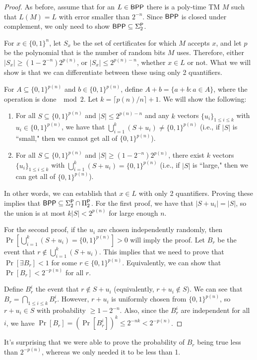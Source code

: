 \begin{proof}
As before, assume that for an $L \in {\ensuremath{\mathsf{BPP}}}$ there is a poly-time TM $M$ such that $L(M) = L$ with error smaller than $2^{-n}$. Since ${\mathsf{BPP}}$ is closed under complement, we only need to show ${\mathsf{BPP}} \subseteq \Sigma_2^{\mathsf{P}}$.

\par For $x \in \{0, 1\}^n$, let $S_x$ be the set of certificates for which $M$ accepts $x$, and let $p$ be the polynomial that is the number of random bits $M$ uses. Therefore, either $|S_x| \ge (1-2^{-n})2^{p(n)}$, or $|S_x| \le 2^{p(n)-n}$, whether $x \in L$ or not. What we will show is that we can differentiate between these using only 2 quantifiers.

\par For $A \subseteq \{0, 1\}^{p(n)}$ and $b \in \{0, 1\}^{p(n)}$, define $A+b = \{a+b \colon a \in A\}$, where the operation is done $\mod 2$. Let $k = \lceil {p(n)/n} \rceil +1$. We will show the following:

\begin{enumerate}
\item For all $S \subseteq \{0, 1\}^{p(n)}$ and $|S| \le 2^{p(n)-n}$ and any $k$ vectors $\{u_i\}_{1 \le i \le k}$ with $u_i \in \{0, 1\}^{p(n)}$, we have that $\bigcup_{i=1}^{k} (S+u_i) \ne \{0, 1\}^{p(n)}$ (i.e., if $|S|$ is ``small," then we cannot get all of $\{0, 1\}^{p(n)}$). 

\item For all $S \subseteq \{0, 1\}^{p(n)}$ and $|S| \ge (1-2^{-n})2^{p(n)}$, there exist $k$ vectors $\{u_i\}_{1 \le i \le k}$ with $\bigcup_{i=1}^{k}(S+u_i) = \{0, 1\}^{p(n)}$ (i.e., if $|S|$ is ``large," then we can get all of $\{0, 1\}^{p(n)}$).
\end{enumerate}
In other words, we can establish that $x \in L$ with only 2 quantifiers. Proving these implies that ${\mathsf{BPP}} \subseteq \Sigma_2^{\mathsf{P}} \cap \Pi_2^{\mathsf{P}}$. For the first proof, we have that $|S + u_i| = |S|$, so the union is at most $k|S| < 2^{p(n)}$ for large enough $n$.

\par For the second proof, if the $u_i$ are chosen independently randomly, then $\Pr[\bigcup_{i=1}^{k}(S+u_i) = \{0, 1\}^{p(n)}] > 0$ will imply the proof. Let $B_r$ be the event that $r \notin \bigcup_{i=1}^{k}(S+u_i)$. This implies that we need to prove that $\Pr[\exists B_r] < 1$ for some $r \in \{0, 1\}^{p(n)}$. Equivalently, we can show that $\Pr[B_r] < 2^{-p(n)}$ for all $r$. 

\par Define $B_r^i$ the event that $r \notin S + u_i$ (equivalently, $r + u_i \notin S$). We can see that $B_r = \bigcap_{1 \le i \le k}B_{r}^i$. However, $r+u_i$ is uniformly chosen from $\{0, 1\}^{p(n)}$, so $r+u_i \in S$ with probability $\ge 1-2^{-n}$. Also, since the $B_r^i$ are independent for all $i$, we have $\Pr[B_r] = (\Pr[B_r^i])^k \le 2^{-nk} < 2^{-p(n)}$. 
\end{proof}
It's surprising that we were able to prove the probability of $B_r$ being true less than $2^{-p(n)}$, whereas we only needed it to be less than 1. 

